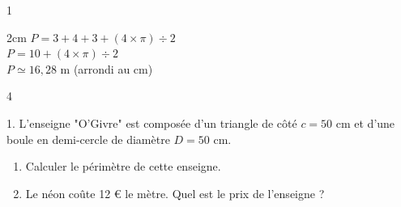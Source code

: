 \documentclass[a4paper]{book}
\begin{document}
{\begin{exerciceNote}{1}
\begin{minipage}{0.6\linewidth}
            \begin{ZoneReponse}{2cm}
                $P=3+4+3+(4\times\pi)\div2$\\
                $P=10+(4\times\pi)\div2$\\
                $P\simeq16,28$ m (arrondi au cm)
            \end{ZoneReponse}
        \end{minipage}
        \hfill
        \begin{minipage}{0.35\linewidth}
            \begin{center}
            \end{center}
        \end{minipage}
    \end{exerciceNote}


    \begin{exerciceNote}{4}
        \begin{minipage}{0.8\linewidth}
            1. L'enseigne "O'Givre" est composée d'un triangle de côté $c = 50$ cm et d'une boule en demi-cercle de diamètre $D = 50$ cm.
            \begin{enumerate}[leftmargin=*, label=\alph*.]
                \item Calculer le périmètre de cette enseigne.
                \item Le néon coûte 12 € le mètre. Quel est le prix de l'enseigne ?
            \end{enumerate}


\end{minipage}
\end{exerciceNote}}
\end{document}
